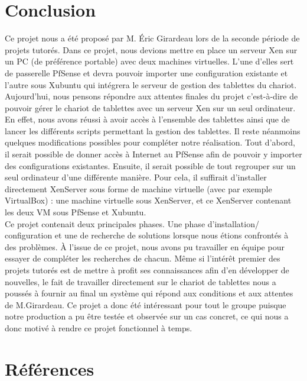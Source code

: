\documentclass[a4paper,12pt]{extarticle}
\begin{document}
\clearpage

\section{Conclusion}
Ce projet nous a été proposé par M. Éric Girardeau lors de la seconde période de projets tutorés. Dans ce projet, nous devions mettre en place un serveur Xen sur un PC (de préférence portable) avec deux machines virtuelles. L’une d’elles sert de passerelle PfSense et devra pouvoir importer une configuration existante et l’autre sous Xubuntu qui intégrera le serveur de gestion des tablettes du chariot.\\

Aujourd’hui, nous pensons répondre aux attentes finales du projet c’est-à-dire de pouvoir gérer le chariot de tablettes avec un serveur Xen sur un seul ordinateur. En effet, nous avons réussi à avoir accès à l’ensemble des tablettes ainsi que de lancer les différents scripts permettant la gestion des tablettes.\newline
Il reste néanmoins quelques modifications possibles pour compléter notre réalisation.
Tout d’abord, il serait possible de donner accès à Internet au PfSense afin de pouvoir y importer des configurations existantes. Ensuite, il serait possible de tout regrouper sur un seul ordinateur d’une différente manière. Pour cela, il suffirait d’installer directement XenServer sous forme de machine virtuelle (avec par exemple VirtualBox) : une machine virtuelle sous XenServer, et ce XenServer contenant les deux VM sous PfSense et Xubuntu.\\

Ce projet contenait deux principales phases. Une phase d’installation/ configuration et une de recherche de solutions lorsque nous étions confrontés à des problèmes.
À l’issue de ce projet, nous avons pu travailler en équipe pour essayer de compléter les recherches de chacun. Même si l'intérêt premier des projets tutorés est de mettre à profit ses connaissances afin d’en développer de nouvelles, le fait de travailler directement sur le chariot de tablettes nous a poussés à fournir au final un système qui répond aux conditions et aux attentes de M.Girardeau. Ce projet a donc été intéressant pour tout le groupe puisque notre production a pu être testée et observée sur un cas concret, ce qui nous a donc motivé à rendre ce projet fonctionnel à temps. 

\clearpage
\section{Références}
\end{document}
